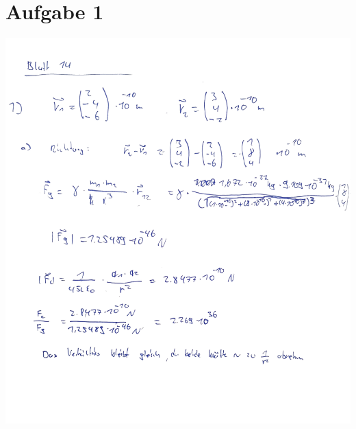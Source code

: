 \documentclass[a4paper]{article}
\begin{document}
\thispagestyle{fancy}

\section*{Aufgabe 1}
\includegraphics[width=15cm]{1.jpg}

\newpage
\setlength{\headheight}{0cm}
\end{document}
